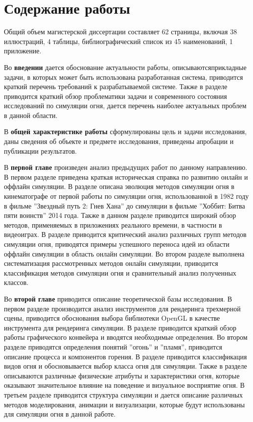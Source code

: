 \part*{Содержание работы}

Общий объем магистерской диссертации составляет 62 страницы, включая 38
иллюстраций, 4 таблицы, библиографический список из 45 наименований, 1
приложение.

Во \textbf{введении} дается обоснование актуальности работы,
описываются\break{}прикладные задачи, в которых может быть использована
разработанная система, приводится краткий перечень требований к разрабатываемой
системе. Также в разделе приводится краткий обзор проблематики задачи и
современного состояния исследований по симуляции огня, дается перечень наиболее
актуальных проблем в данной области.

В \textbf{общей характеристике работы} сформулированы цель и задачи
исследования, даны сведения об объекте и предмете исследования, приведены
апробации и публикации результатов.

В \textbf{первой главе} произведен анализ предыдущих работ по данному
направлению. В первом разделе приведена краткая историческая справка по развитию
онлайн и оффлайн симуляции. В разделе описана эволюция методов симуляции огня в
кинематографе от первой работы по симуляции огня, использованной в 1982 году в
фильме ''Звездный путь 2: Гнев Хана'' до симуляции в фильме ''Хоббит: Битва пяти
воинств'' 2014 года. Также в данном разделе приводится широкий обзор методов,
применяемых в приложениях реального времени, в частности в видеоиграх. В разделе
приводится критический анализ различных групп методов симуляции огня, приводятся
примеры успешного переноса идей из области оффлайн симуляции в область онлайн
симуляции. Во втором разделе выполнена систематизация рассмотренных методов
онлайн симуляции, приводится классификация методов симуляции огня и
сравнительный анализ полученных классов.

Во \textbf{второй главе} приводится описание теоретической базы исследования.
В первом разделе производится анализ инструментов для рендеринга трехмерной
сцены, приводится обоснования выбора библиотеки OpenGL в качестве инструмента
для рендеринга симуляции. В разделе приводится краткий обзор работы графического
конвейера и вводятся необходимые определения. Во втором разделе
приводятся определения понятий ''огонь'' и ''пламя'', приводится описание
процесса и компонентов горения. В разделе приводится
классификация видов огня и обосновывается выбор класса огня для симуляции. Также
в разделе описываются различные физические атрибуты и характеристики огня,
которые оказывают значительное влияние на поведение и визуальное восприятие
огня. В третьем разделе приводится структура симуляции и дается описание
различных методов моделирования, анимации и визуализации, которые будут
использованы для симуляции огня в данной работе.

